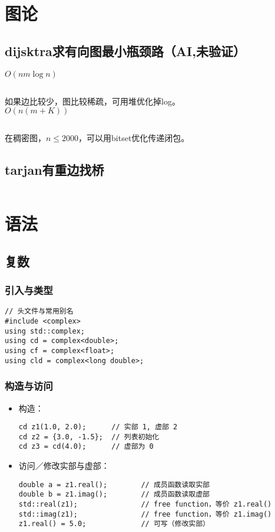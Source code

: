 \documentclass[a4paper]{report}
\newcommand{\cppcode}[1]{  
    \inputminted[mathescape]{cpp}{source/#1}  
}
\begin{document}
\chapter{图论}
\section{dijsktra求有向图最小瓶颈路（AI,未验证）}
$O(nm\log n)$
\cppcode{mindij.cpp}
如果边比较少，图比较稀疏，可用堆优化掉log。\\
$O(n(m+K))$
\cppcode{heapminmaxdij.cpp}
在稠密图，$n\le 2000$，可以用bitset优化传递闭包。

\section{tarjan有重边找桥}
\cppcode{tarjan有重边找桥.cpp}


\chapter{语法}
\section{复数}

\subsection*{引入与类型}
\begin{verbatim}
// 头文件与常用别名
#include <complex>
using std::complex;
using cd = complex<double>;
using cf = complex<float>;
using cld = complex<long double>;
\end{verbatim}

\subsection*{构造与访问}
\begin{itemize}
  \item 构造：
\begin{verbatim}
cd z1(1.0, 2.0);      // 实部 1, 虚部 2
cd z2 = {3.0, -1.5};  // 列表初始化
cd z3 = cd(4.0);      // 虚部为 0
\end{verbatim}
  \item 访问／修改实部与虚部：
\begin{verbatim}
double a = z1.real();        // 成员函数读取实部
double b = z1.imag();        // 成员函数读取虚部
std::real(z1);               // free function，等价 z1.real()
std::imag(z1);               // free function，等价 z1.imag()
z1.real() = 5.0;             // 可写（修改实部）
\end{verbatim}
\end{itemize}
\end{document}
